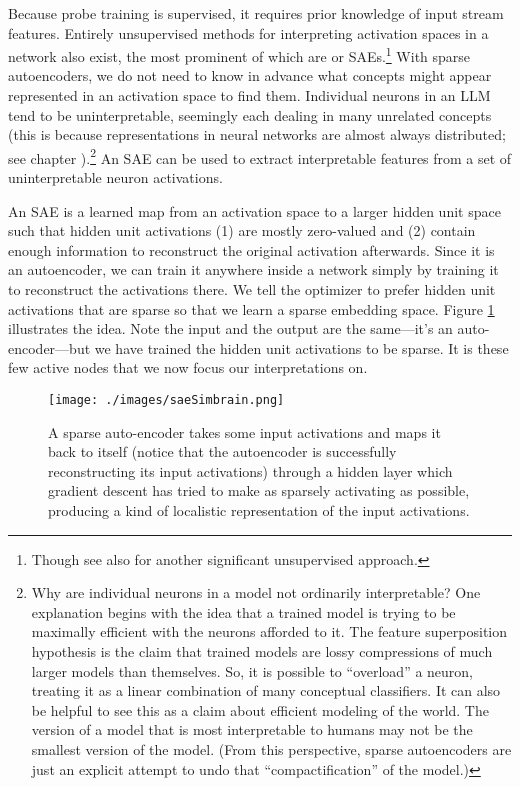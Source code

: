 Because probe training is supervised, it requires prior knowledge of input
stream features. Entirely unsupervised methods for interpreting activation
spaces in a network also exist, the most prominent of which are
 or SAEs.\footnote{Though see also
\cite{burns2024discovering} for another significant unsupervised approach.}
With sparse autoencoders, we do not need to know in advance what concepts might
appear represented in an activation space to find them. Individual neurons in
an LLM tend to be uninterpretable, seemingly each dealing in many unrelated
concepts \cite{elhage2022superposition, scherlis2025polysemanticity} (this is
because representations in neural networks are almost always distributed; see
chapter ).\footnote{Why are individual neurons in a model not
ordinarily interpretable? One explanation begins with the idea that a trained
model is trying to be maximally efficient with the neurons afforded to it. The
feature superposition hypothesis is the claim that trained models are lossy
compressions of much larger models than themselves. So, it is possible to
``overload'' a neuron, treating it as a linear combination of many conceptual
classifiers. It can also be helpful to see this as a claim about efficient
modeling of the world. The version of a model that is most interpretable to
humans may not be the smallest version of the model. (From this perspective,
sparse autoencoders are just an explicit attempt to undo that
``compactification'' of the model.)} An SAE can be used to extract
interpretable features from a set of uninterpretable neuron activations.

An SAE is a learned map from an activation space to a larger hidden unit space
such that hidden unit activations (1) are mostly zero-valued and (2) contain
enough information to reconstruct the original activation afterwards. Since it
is an autoencoder, we can train it anywhere inside a network simply by training
it to reconstruct the activations there. We tell the optimizer to prefer hidden
unit activations that are sparse so that we learn a sparse embedding space.
Figure \ref{saeSimbrain} illustrates the idea. Note the input and the output
are the same---it's an auto-encoder---but we have trained the hidden unit
activations to be sparse. It is these few active nodes that we now focus our
interpretations on.

\begin{figure}[ht]
\centering
\texttt{[image: ./images/saeSimbrain.png]}
\caption[Simbrain screenshot from Jeff Yoshimi.]{ A sparse auto-encoder takes
      some input activations and maps it back to itself (notice that the
      autoencoder is successfully reconstructing its input activations) through
      a hidden layer which gradient descent has tried to make as sparsely
      activating as possible, producing a kind of localistic representation of
      the input activations. }
\label{saeSimbrain}
\end{figure}


